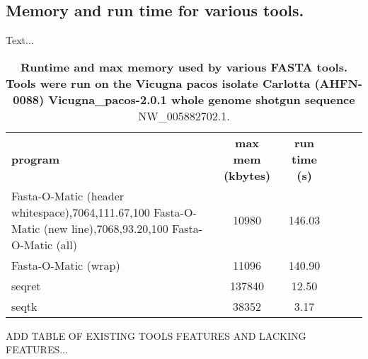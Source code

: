 \subsection{Memory and run time for various tools.}

Text...  

\begin{table}
\begin{center}
\begin{tabular}{lccccc}
\hline
 \textbf{program} & \textbf{max mem (kbytes)}  & \textbf{run time (s)}  \\ 
 Fasta-O-Matic (header whitespace),7064,111.67,100
Fasta-O-Matic (new line),7068,93.20,100				  
Fasta-O-Matic (all)          & 10980      & 146.03     \\   
Fasta-O-Matic (wrap)          & 11096      & 140.90     \\ 
seqret          & 137840      & 12.50     \\              
seqtk          & 38352      & 3.17      \\            
\hline
\end{tabular}
\end{center}
\caption{\textbf{Runtime and max memory used by various FASTA tools. Tools were run on the Vicugna pacos isolate Carlotta (AHFN-0088) Vicugna_pacos-2.0.1 whole genome shotgun sequence} NW_005882702.1.}
\end{table}

ADD TABLE OF EXISTING TOOLS FEATURES AND LACKING FEATURES...
